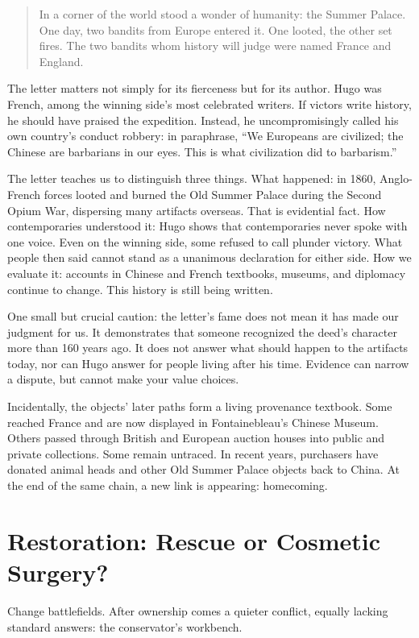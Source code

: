 \begin{quote}
In a corner of the world stood a wonder of humanity: the Summer Palace. One day, two bandits from Europe entered it. One looted, the other set fires. The two bandits whom history will judge were named France and England.
\end{quote}
The letter matters not simply for its fierceness but for its author. Hugo was French, among the winning side's most celebrated writers. If victors write history, he should have praised the expedition. Instead, he uncompromisingly called his own country's conduct robbery: in paraphrase, ``We Europeans are civilized; the Chinese are barbarians in our eyes. This is what civilization did to barbarism.''

The letter teaches us to distinguish three things. What happened: in 1860, Anglo-French forces looted and burned the Old Summer Palace during the Second Opium War, dispersing many artifacts overseas. That is evidential fact. How contemporaries understood it: Hugo shows that contemporaries never spoke with one voice. Even on the winning side, some refused to call plunder victory. What people then said cannot stand as a unanimous declaration for either side. How we evaluate it: accounts in Chinese and French textbooks, museums, and diplomacy continue to change. This history is still being written.

One small but crucial caution: the letter's fame does not mean it has made our judgment for us. It demonstrates that someone recognized the deed's character more than 160 years ago. It does not answer what should happen to the artifacts today, nor can Hugo answer for people living after his time. Evidence can narrow a dispute, but cannot make your value choices.

Incidentally, the objects' later paths form a living provenance textbook. Some reached France and are now displayed in Fontainebleau's Chinese Museum. Others passed through British and European auction houses into public and private collections. Some remain untraced. In recent years, purchasers have donated animal heads and other Old Summer Palace objects back to China. At the end of the same chain, a new link is appearing: homecoming.

\section{Restoration: Rescue or Cosmetic Surgery?}
Change battlefields. After ownership comes a quieter conflict, equally lacking standard answers: the conservator's workbench.

